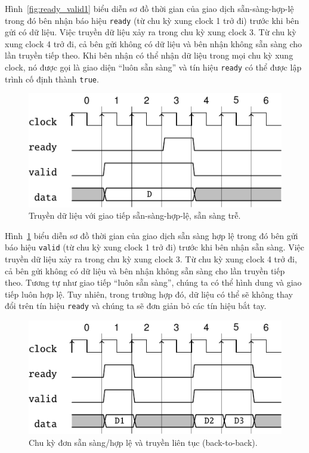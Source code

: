 \documentclass[%
    10pt,
    headinclude, footexclude,
    openright, %
    notitlepage,
    cleardoubleempty,
    headsepline,
    pointlessnumbers,
    bibtotoc, idxtotoc,
    ]{scrbook}
\newcommand{\code}[1]{{\small{\texttt{#1}}}}
\begin{document}
Hình~\ref{fig:ready_valid1} biểu diễn sơ đồ thời gian của giao dịch sẵn-sàng-hợp-lệ trong đó bên nhận báo hiệu \code{ready} (từ chu kỳ xung clock 1 trở đi) trước khi bên gửi có dữ liệu. Việc truyền dữ liệu xảy ra trong chu kỳ xung clock 3. Từ chu kỳ xung clock 4 trở đi, cả bên gửi không có dữ liệu và bên nhận không sẵn sàng cho lần truyền tiếp theo. Khi bên nhận có thể nhận dữ liệu trong mọi chu kỳ xung clock, nó được gọi là giao diện ``luôn sẵn sàng'' và tín hiệu \code {ready} có thể được lập trình cố định thành \code{true}. 

\begin{figure}
  \centering
  \includegraphics[scale=1]{figures/ready_valid2}
  \caption{Truyền dữ liệu với giao tiếp sẵn-sàng-hợp-lệ, sẵn sàng trễ.}
  \label{fig:ready_valid2}
\end{figure}

Hình~\ref{fig:ready_valid2} biểu diễn sơ đồ thời gian của giao dịch sẵn sàng hợp lệ trong đó bên gửi báo hiệu \code{valid} (từ chu kỳ xung clock 1 trở đi) trước khi bên nhận sẵn sàng. Việc truyền dữ liệu xảy ra trong chu kỳ xung clock 3. Từ chu kỳ xung clock 4 trở đi, cả bên gửi không có dữ liệu và bên nhận không sẵn sàng cho lần truyền tiếp theo. Tương tự như giao tiếp ``luôn sẵn sàng'', chúng ta có thể hình dung và giao tiếp luôn hợp lệ. Tuy nhiên, trong trường hợp đó, dữ liệu có thể sẽ không thay đổi trên tín hiệu \code{ready} và chúng ta sẽ đơn giản bỏ các tín hiệu bắt tay. 

\begin{figure}
  \centering
  \includegraphics[scale=1]{figures/ready_valid3}
  \caption{Chu kỳ đơn sẵn sàng/hợp lệ và truyền liên tục (back-to-back).}
  \label{fig:ready_valid3}
\end{figure}
\end{document}
